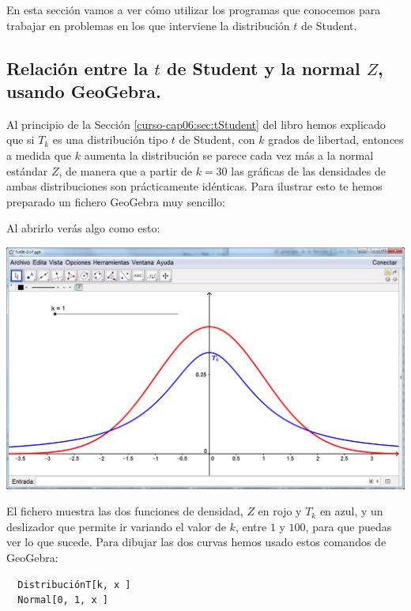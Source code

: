 \documentclass[10pt,a4paper]{article}\usepackage[]{graphicx}\usepackage[]{color}
\begin{document}
En esta sección vamos a ver cómo utilizar los programas que conocemos para trabajar en problemas en los que interviene la distribución $t$ de Student.

\subsection{Relación entre la $t$ de Student y la normal $Z$, usando GeoGebra.}
\label{tut06:subsec:RelacionStudentZUsandoGeoGebra}

Al principio de la Sección \ref{curso-cap06:sec:tStudent} del libro hemos explicado que si $T_k$ es una distribución tipo $t$ de Student,  con $k$ grados de libertad, entonces a medida que $k$ aumenta la distribución se parece cada vez más a la normal estándar $Z$, de manera que a partir de $k=30$ las gráficas de las densidades de ambas distribuciones son prácticamente idénticas. Para ilustrar esto te hemos preparado un fichero GeoGebra muy sencillo:
\begin{center}
\end{center}
Al abrirlo verás algo como esto:
  \begin{center}
        \includegraphics[width=14cm]{../fig/Tut06-28.png}
  \end{center}


El fichero muestra las dos funciones de densidad, $Z$ en rojo y $T_k$ en azul, y un deslizador que permite ir variando el valor de $k$, entre $1$ y $100$, para que puedas ver lo que sucede. Para dibujar las dos curvas hemos usado estos comandos de GeoGebra:
\begin{verbatim}
  DistribuciónT[k, x ]
  Normal[0, 1, x ]
\end{verbatim}
\end{document}

